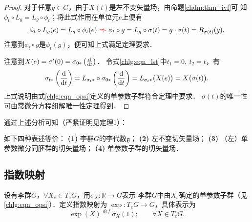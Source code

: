 \begin{proof}
对于任意$g\in G$，由于$X(t)$是左不变矢量场，由命题\ref{chdm:thm_ivf}可
知$\phi_t\circ L_g = L_g\circ \phi_t$；将此式作用在单位元$e$上便有
\begin{equation}
    \phi_t\circ L_g (e)= L_g\circ \phi_t (e) {\ \color{red}\Rightarrow \ }
    \phi_t\circ g= L_g\circ \sigma(t) = g\cdot \sigma(t) = R_{\sigma(t)}(g).
\end{equation}
注意到$\phi_t\circ g$是$\phi_t(g)$，便可知上式满足定理要求．

    注意到$X(e)=\sigma'(0)=\sigma_{0*}\left(\frac{{\rm d}}{{\rm d}t}\right)$．
令式\eqref{chlg:eqn_lst}中$t_1=0,\ t_2=t$，有
\begin{equation}
    \sigma_{t*}\left( \frac{{\rm d}}{{\rm d}t}\right) 
    =L_{\sigma_{t}*}\circ\sigma_{0*}\left(\frac{{\rm d}}{{\rm d}t}\right)
    =L_{\sigma_{t}*}\bigl(X(e)\bigr) = X\bigl(\sigma(t)\bigr).
\end{equation}
上式说明由式\eqref{chlg:eqn_opsi}定义的单参数子群符合定理中要求．
$\sigma(t)$的唯一性可由常微分方程组解唯一性定理得到．
\end{proof}

通过上述分析可知（严紧证明见\parencite[\S 2.1]{xiang-hou-meng-2014}定理1）：
\begin{theorem}\label{chlg:thm_la4}
    如下四种表述等价：
    {\bfseries (1)} 李群$G$的李代数$\mathfrak{g}$；
    {\bfseries (2)} 左不变切矢量场；
    {\bfseries (3)} （左）单参数微分同胚群的切矢量场；
    {\bfseries (4)} 单参数子群的切矢量场．
\end{theorem}


  

\subsection{指数映射}\label{chlg:sec_exp-map}

\begin{definition}\label{chlg:def_exp-map}
    设有李群$G$，$\forall X_e \in T_eG$，用$\sigma_X:\mathbb{R}\to G$表示
    李群$G$中由$X_e$确定的单参数子群（见\eqref{chlg:eqn_opsi}）．定义{\heiti 指数映射}为
    $\exp : T_e G \to G$，具体表示为
    \begin{equation}\label{chlg:eqn_exp-map}
        \exp(X) \overset{def}{=} \sigma_X(1); \qquad \forall X \in T_eG . 
    \end{equation}
\end{definition}


